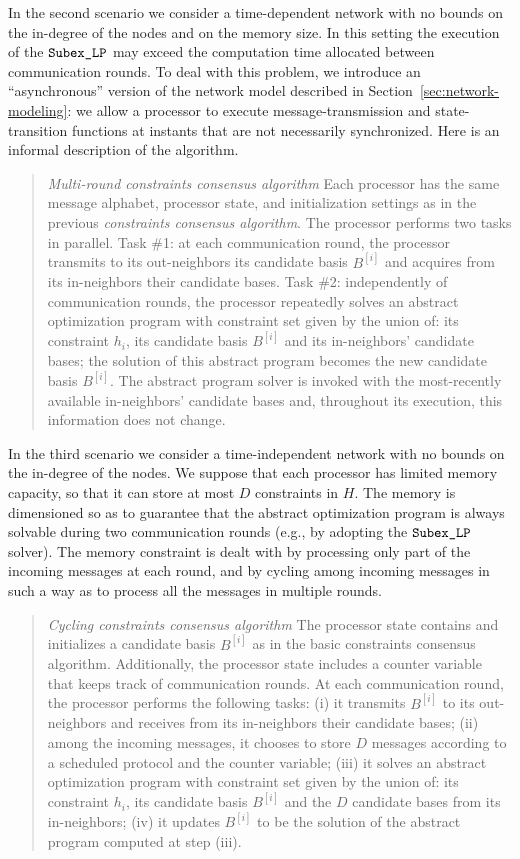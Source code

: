 \documentclass[onecolumn,journal,letterpaper]{IEEEtran}
\newcommand{\subexLP}{\textup{\texttt{SUBEX\_lp}}}
\renewcommand{\subexLP}{\textup{\texttt{Subex\_LP}}}
\newcommand{\supind}[2]{{#1}^{[#2]}}
\begin{document}
In the second scenario we consider a time-dependent network with no bounds
on the in-degree of the nodes and on the memory size. In this setting the
execution of the $\subexLP$ may exceed the computation time allocated
between communication rounds.  To deal with this problem, we introduce an
``asynchronous'' version of the network model described in
Section~\ref{sec:network-modeling}: we allow a processor to execute
message-transmission and state-transition functions at instants that are
not necessarily synchronized. Here is an informal description of the
algorithm.
\begin{quote}
  \emph{Multi-round constraints consensus algorithm} Each processor has the
  same message alphabet, processor state, and initialization settings as in
  the previous \emph{constraints consensus algorithm}.
The processor performs two tasks in parallel. Task \#1: at each
  communication round, the processor transmits to its out-neighbors its
  candidate basis $\supind{B}{i}$ and acquires from its in-neighbors their
  candidate bases.
Task \#2: independently of communication rounds, the processor repeatedly
  solves an abstract optimization program with constraint set given by the
  union of: its constraint $h_i$, its candidate basis $\supind{B}{i}$ and
  its in-neighbors' candidate bases; the solution of this abstract program
  becomes the new candidate basis $\supind{B}{i}$.
The abstract program solver is invoked with the most-recently
  available in-neighbors' candidate bases and, throughout its execution,
  this information does not change.
\end{quote}

In the third scenario we consider a time-independent network with no bounds
on the in-degree of the nodes. We suppose that each processor has limited
memory capacity, so that it can store at most $D$ constraints in $H$. The
memory is dimensioned so as to guarantee that the abstract optimization
program is always solvable during two communication rounds (e.g., by
adopting the $\subexLP$ solver). The memory constraint is dealt with by
processing only part of the incoming messages at each round, and by cycling
among incoming messages in such a way as to process all the messages in
multiple rounds.
\begin{quote}
  \emph{Cycling constraints consensus algorithm} The processor state
  contains and initializes a candidate basis $\supind{B}{i}$ as in the
  basic constraints consensus algorithm.  Additionally, the processor state
  includes a counter variable that keeps track of communication rounds.
At each communication round, the processor performs the following tasks:
  (i) it transmits $\supind{B}{i}$ to its out-neighbors and receives from
  its in-neighbors their candidate bases;
(ii) among the incoming messages, it chooses to store $D$ messages
  according to a scheduled protocol and the counter variable;
(iii) it solves an abstract optimization program with constraint set
  given by the union of: its constraint $h_i$, its candidate basis
  $\supind{B}{i}$ and the $D$ candidate bases from its in-neighbors; (iv)
  it updates $\supind{B}{i}$ to be the solution of the abstract program
  computed at step (iii).
\end{quote}
\end{document}
